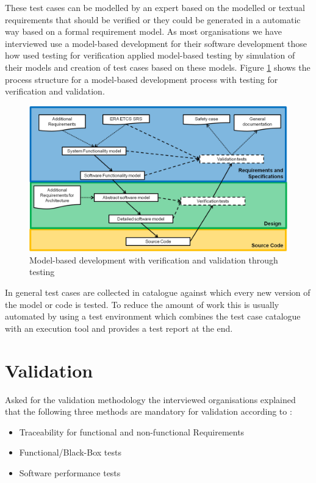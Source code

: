 \documentclass{./template/openetcs_report}
\begin{document}
These test cases can be modelled by an expert based on the modelled or textual requirements that should be verified or they could be generated in a automatic way based on a formal requirement model. As most organisations we have interviewed use a model-based development for their software development those how used testing for verification applied model-based testing by simulation of their models and creation of test cases based on these models. Figure \ref{fig: MBD-Testing} shows the process structure for a model-based development process with testing for verification and validation.

\begin{figure}[h]
\centering
\includegraphics[scale=0.6]{Lifecycle-Model-based-Approach-Testing.png}
\caption{Model-based development with verification and validation through testing}
\label{fig: MBD-Testing}
\end{figure}

In general test cases are collected in catalogue against which every new version of the model or code is tested. To reduce the amount of work this is usually automated by using a test environment which combines the test case catalogue with an execution tool and provides a test report at the end.

\section{Validation}

Asked for the validation methodology the interviewed organisations explained that the following three methods are mandatory for validation according to \citeauthor{EN50128:2011}:

\vspace{-10pt}
\begin{itemize}[topsep=2pt, partopsep=2pt,itemsep=2pt,parsep=2pt]
\item Traceability for functional and non-functional Requirements
\item Functional/Black-Box tests
\item Software performance tests
\end{itemize}
\end{document}
